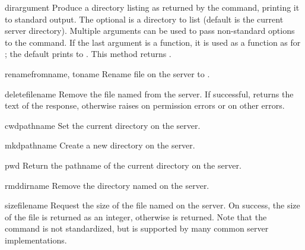 \begin{methoddesc}[FTP]{dir}{argument\optional{, \ldots}}
Produce a directory listing as returned by the  command,
printing it to standard output.  The optional  is a
directory to list (default is the current server directory).  Multiple
arguments can be used to pass non-standard options to the 
command.  If the last argument is a function, it is used as a
 function as for ; the default
prints to .  This method returns .
\end{methoddesc}

\begin{methoddesc}[FTP]{rename}{fromname, toname}
Rename file  on the server to .
\end{methoddesc}

\begin{methoddesc}[FTP]{delete}{filename}
Remove the file named  from the server.  If successful,
returns the text of the response, otherwise raises
 on permission errors or
 on other errors.
\end{methoddesc}

\begin{methoddesc}[FTP]{cwd}{pathname}
Set the current directory on the server.
\end{methoddesc}

\begin{methoddesc}[FTP]{mkd}{pathname}
Create a new directory on the server.
\end{methoddesc}

\begin{methoddesc}[FTP]{pwd}{}
Return the pathname of the current directory on the server.
\end{methoddesc}

\begin{methoddesc}[FTP]{rmd}{dirname}
Remove the directory named  on the server.
\end{methoddesc}

\begin{methoddesc}[FTP]{size}{filename}
Request the size of the file named  on the server.  On
success, the size of the file is returned as an integer, otherwise
 is returned.  Note that the  command is not 
standardized, but is supported by many common server implementations.
\end{methoddesc}

